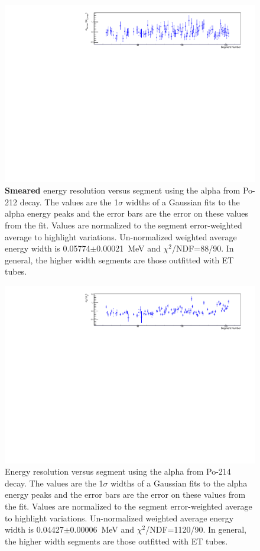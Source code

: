\begin{figure}[!h]
\centering
\includegraphics[width=1.05\textwidth]{figures/PubBiPo212EsmearresvsCell.pdf}
\caption{\label{fig:EsmearresvsCell212}{\bf Smeared} energy resolution versus segment using the alpha from Po-212 decay. The values are the 1$\sigma$ widths of a Gaussian fits to the alpha energy peaks and the error bars are the error on these values from the fit. Values are normalized to the segment error-weighted average to highlight variations. Un-normalized weighted average energy width is 0.05774$\pm$0.00021~MeV and $\chi^2$/NDF=88/90.  In general, the higher width segments are those outfitted with ET tubes.}
\end{figure}
\begin{figure}[!h]
\centering
\includegraphics[width=1.05\textwidth]{figures/PubBiPo214EresvsCell.pdf}
\caption{\label{fig:EresvsCell214}Energy resolution versus segment using the alpha from Po-214 decay. The values are the 1$\sigma$ widths of a Gaussian fits to the alpha energy peaks and the error bars are the error on these values from the fit. Values are normalized to the segment error-weighted average to highlight variations. Un-normalized weighted average energy width is 0.04427$\pm$0.00006~MeV and $\chi^2$/NDF=1120/90.  In general, the higher width segments are those outfitted with ET tubes.}
\end{figure}
